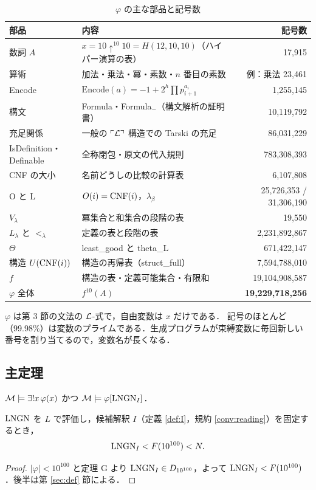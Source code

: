 \begin{table}[htbp]
\centering\small
\caption{$\varphi$ の主な部品と記号数}\label{tab:parts}
\begin{tabular}{p{}p{}r}
\toprule
部品 & 内容 & 記号数\\
\midrule
数詞 $A$ & $x=10\uparrow^{10}10=H(12,10,10)$（ハイパー演算の表） & 17{,}915\\
算術 & 加法・乗法・冪・素数・$n$ 番目の素数 & 例：乗法 23{,}461\\
Encode & $\mathrm{Encode}(a)=-1+2^h\prod p_{i+1}^{a_i}$ & 1{,}255{,}145\\
構文 & Formula・Formula$_-$（構文解析の証明書） & 10{,}119{,}792\\
充足関係 & 一般の $\ulcorner\mathcal{L}\urcorner$ 構造での Tarski の充足 & 86{,}031{,}229\\
IsDefinition・Definable & 全称閉包・原文の代入規則 & 783{,}308{,}393\\
CNF の大小 & 名前どうしの比較の計算表 & 6{,}107{,}808\\
O と L & $O(i)=\mathrm{CNF}(i)$，$\lambda_\beta$ & 25{,}726{,}353 / 31{,}306{,}190\\
$V_\lambda$ & 冪集合と和集合の段階の表 & 19{,}550\\
$L_\lambda$ と $<_\lambda$ & 定義の表と段階の表 & 2{,}231{,}892{,}867\\
$\Theta$ & least\_good と theta\_L & 671{,}422{,}147\\
構造 $U(\mathrm{CNF}(i))$ & 構造の再帰表（struct\_full） & 7{,}594{,}788{,}010\\
$f$ & 構造の表・定義可能集合・有限和 & 19{,}104{,}908{,}587\\
\midrule
$\varphi$ 全体 & $f^{10}(A)$ & \textbf{19{,}229{,}718{,}256}\\
\bottomrule
\end{tabular}
\end{table}

$\varphi$ は第 3 節の文法の $\mathcal{L}$-式で，自由変数は $x$ だけである．
記号のほとんど（99.98\%）は変数のプライムである．生成プログラムが束縛変数に毎回新しい番号を割り当てるので，変数名が長くなる．

\subsection{主定理}
\begin{theorem}[定理 G]\label{thm:G}
$\mathcal{M}\models\exists!x\,\varphi(x)$ かつ $\mathcal{M}\models\varphi[\mathrm{LNGN}_I]$．
\end{theorem}

\begin{corollary}[主定理]\label{cor:main}
$\mathrm{LNGN}$ を $L$ で評価し，候補解釈 $I$（定義 \ref{def:I}，規約 \ref{conv:reading}）を固定するとき，
\[ \mathrm{LNGN}_I < F(10^{100}) < N. \]
\end{corollary}
\begin{proof}
$|\varphi|<10^{100}$ と定理 G より $\mathrm{LNGN}_I\in D_{10^{100}}$，よって $\mathrm{LNGN}_I<F(10^{100})$．後半は第 \ref{sec:def} 節による．
\end{proof}
